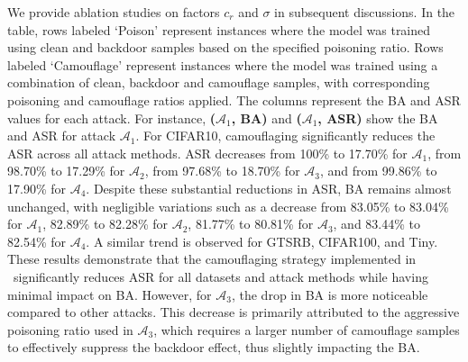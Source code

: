 We provide ablation studies on factors $c_{r}$ and $\sigma$ in subsequent discussions. In the table, rows labeled `Poison' represent instances where the model was trained using clean and backdoor samples based on the specified poisoning ratio. Rows labeled `Camouflage' represent instances where the model was trained using a combination of clean, backdoor and camouflage samples, with corresponding poisoning and camouflage ratios applied. The columns represent the BA and ASR values for each attack. For instance, \textbf{($\mathcal{A}_1$, BA)} and \textbf{($\mathcal{A}_1$, ASR)} show the BA and ASR for attack $\mathcal{A}_1$. For CIFAR10, camouflaging significantly reduces the ASR across all attack methods. ASR decreases from 100\% to 17.70\% for $\mathcal{A}_1$, from 98.70\% to 17.29\% for $\mathcal{A}_2$, from 97.68\% to 18.70\% for $\mathcal{A}_3$, and from 99.86\% to 17.90\% for $\mathcal{A}_4$. Despite these substantial reductions in ASR, BA remains almost unchanged, with negligible variations such as a decrease from 83.05\% to 83.04\% for $\mathcal{A}_1$, 82.89\% to 82.28\% for $\mathcal{A}_2$, 81.77\% to 80.81\% for $\mathcal{A}_3$, and 83.44\% to 82.54\% for $\mathcal{A}_4$. A similar trend is observed for GTSRB, CIFAR100, and Tiny. These results demonstrate that the camouflaging strategy implemented in \methodname~significantly reduces ASR for all datasets and attack methods while having minimal impact on BA. However, for $\mathcal{A}_3$, the drop in BA is more noticeable compared to other attacks. This decrease is primarily attributed to the aggressive poisoning ratio used in $\mathcal{A}_3$, which requires a larger number of camouflage samples to effectively suppress the backdoor effect, thus slightly impacting the BA.

